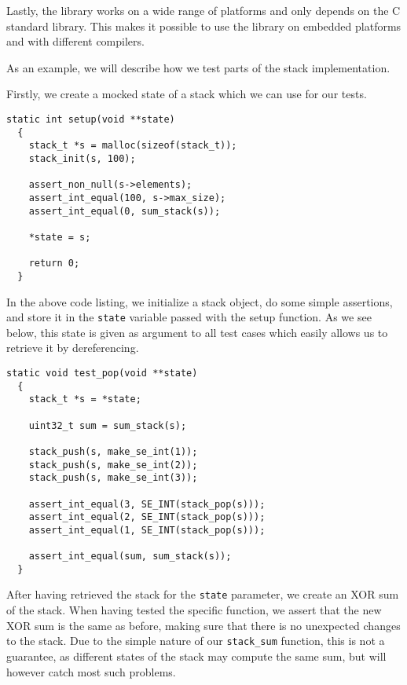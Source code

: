 Lastly, the library works on a wide range of platforms and only depends on the C
standard library. This makes it possible to use the library on embedded
platforms and with different compilers.

As an example, we will describe how we test parts of the stack implementation.

Firstly, we create a mocked state of a stack which we can use for our tests.

\begin{lstlisting}[language={[ANSI]C},caption={Unit-test setup procedure}]
  static int setup(void **state)
  {
    stack_t *s = malloc(sizeof(stack_t));
    stack_init(s, 100);

    assert_non_null(s->elements);
    assert_int_equal(100, s->max_size);
    assert_int_equal(0, sum_stack(s));

    *state = s;

    return 0;
  }
\end{lstlisting}

In the above code listing, we initialize a stack object, do some simple
assertions, and store it in the {\tt state} variable passed with the setup
function. As we see below, this state is given as argument to all test cases
which easily allows us to retrieve it by dereferencing.

\begin{lstlisting}[language={[ANSI]C},caption={Unit-test of {\tt stack\_pop}}]
  static void test_pop(void **state)
  {
    stack_t *s = *state;

    uint32_t sum = sum_stack(s);

    stack_push(s, make_se_int(1));
    stack_push(s, make_se_int(2));
    stack_push(s, make_se_int(3));

    assert_int_equal(3, SE_INT(stack_pop(s)));
    assert_int_equal(2, SE_INT(stack_pop(s)));
    assert_int_equal(1, SE_INT(stack_pop(s)));

    assert_int_equal(sum, sum_stack(s));
  }
\end{lstlisting}

After having retrieved the stack for the {\tt state} parameter, we create an XOR
sum of the stack. When having tested the specific function, we assert that the
new XOR sum is the same as before, making sure that there is no unexpected
changes to the stack. Due to the simple nature of our {\tt stack\_sum} function,
this is not a guarantee, as different states of the stack may compute the same
sum, but will however catch most such problems. %

